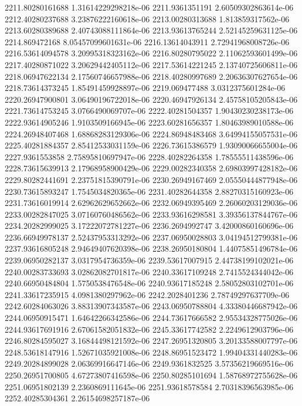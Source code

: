 {2211.80280161688 1.31614229298218e-06
2211.9361351191 2.60509302863614e-06
2212.40280237688 3.23876222160618e-06
2213.00280313688 1.813859317562e-06
2213.60280389688 2.40743088111864e-06
2213.93613765244 2.52145259631125e-06
2214.869472168 8.05457099601631e-06
2216.13614043911 2.72941968008726e-06
2216.53614094578 3.20995318323162e-06
2216.80280795022 2.11062593601499e-06
2217.40280871022 3.20629442405112e-06
2217.53614221245 2.13740725606811e-06
2218.06947622134 2.17560746657988e-06
2218.40280997689 2.20636307627654e-06
2218.73614373245 1.85491459928897e-06
2219.069477488 3.0312375601284e-06
2220.26947900801 3.06490196722018e-06
2220.46947926134 2.45758105205843e-06
2221.73614753245 3.0766490069707e-06
2222.40281504357 1.90430230238173e-06
2222.93614905246 1.9103509166945e-06
2223.60281656357 1.80463989010588e-06
2224.26948407468 1.68868283129306e-06
2224.86948483468 3.64994155057531e-06
2225.40281884357 2.85412533031159e-06
2226.73615386579 1.93090066655004e-06
2227.9361553858 2.75895810697947e-06
2228.40282264358 1.78555511438596e-06
2228.73615639913 2.17968958900429e-06
2229.00282340358 2.69803997428182e-06
2229.80282441691 2.23751815390791e-06
2230.26949167469 2.05550444877948e-06
2230.73615893247 1.7545034820365e-06
2231.40282644358 2.88270315160923e-06
2231.73616019914 2.62962629652662e-06
2232.06949395469 2.26060203129036e-06
2233.00282847025 3.07160760486562e-06
2233.93616298581 3.39356137844767e-06
2234.20282999025 3.17222072781227e-06
2236.2694992747 3.42000860160696e-06
2236.66949978137 2.52437953313292e-06
2237.06950028803 3.04194512799381e-06
2237.93616805248 2.94649407620398e-06
2238.26950180804 1.44075851496784e-06
2239.06950282137 3.0317954736359e-06
2239.53617007915 2.44738199102021e-06
2240.00283733693 3.02862082701817e-06
2240.33617109248 2.7415524344042e-06
2240.66950484804 1.5750538476548e-06
2240.93617185248 2.58052803102701e-06
2241.33617235915 4.0981380297962e-06
2242.2028401236 2.78749297637709e-06
2242.60284063026 3.88313907343587e-06
2243.06950788804 4.33380446687942e-06
2244.06950915471 1.64642266342586e-06
2244.73617666582 2.95534328775026e-06
2244.93617691916 2.67061582051832e-06
2245.33617742582 2.2249612903796e-06
2246.80284595027 3.16844498121592e-06
2247.26951320805 3.20133588007797e-06
2248.53618147916 1.52671035921008e-06
2248.86951523472 1.99404331440283e-06
2249.20284899028 2.06369916647146e-06
2249.9361832525 3.57356219669516e-06
2250.26951700805 4.67273807416598e-06
2250.80285101694 1.58768972755628e-06
2251.06951802139 2.2360869111645e-06
2251.93618578584 2.70318396563985e-06
2252.40285304361 2.26154698257187e-06
}

